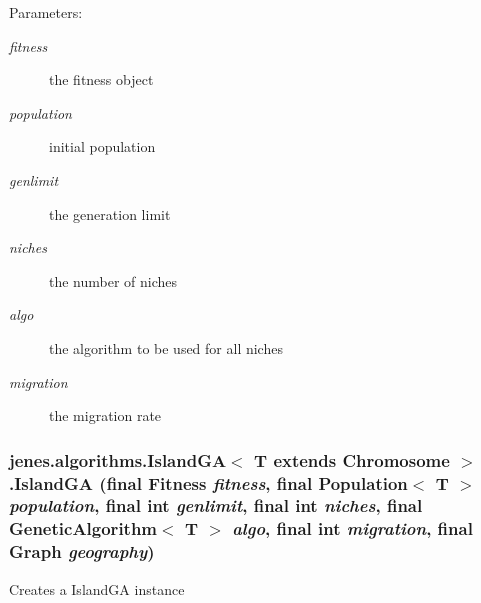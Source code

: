 \begin{Desc}
\item[Parameters:]
\begin{description}
\item[{\em fitness}]the fitness object \item[{\em population}]initial population \item[{\em genlimit}]the generation limit \item[{\em niches}]the number of niches \item[{\em algo}]the algorithm to be used for all niches \item[{\em migration}]the migration rate \end{description}
\end{Desc}
\hypertarget{classjenes_1_1algorithms_1_1_island_g_a_3_01_t_01extends_01_chromosome_01_4_aa6ac59257e351c4b2d50870ec48afee}{
\subsubsection[IslandGA]{\setlength{\rightskip}{0pt plus 5cm}jenes.algorithms.IslandGA$<$ T extends Chromosome $>$.IslandGA (final Fitness {\em fitness}, \/  final Population$<$ T $>$ {\em population}, \/  final int {\em genlimit}, \/  final int {\em niches}, \/  final GeneticAlgorithm$<$ T $>$ {\em algo}, \/  final int {\em migration}, \/  final Graph {\em geography})}}
\label{classjenes_1_1algorithms_1_1_island_g_a_3_01_t_01extends_01_chromosome_01_4_aa6ac59257e351c4b2d50870ec48afee}


Creates a IslandGA instance

